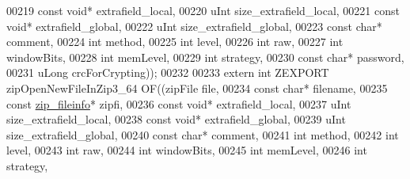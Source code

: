 \begin{DoxyCode}
00219                                             \textcolor{keyword}{const} \textcolor{keywordtype}{void}* extrafield\_local,
00220                                             uInt size\_extrafield\_local,
00221                                             \textcolor{keyword}{const} \textcolor{keywordtype}{void}* extrafield\_global,
00222                                             uInt size\_extrafield\_global,
00223                                             \textcolor{keyword}{const} \textcolor{keywordtype}{char}* comment,
00224                                             \textcolor{keywordtype}{int} method,
00225                                             \textcolor{keywordtype}{int} level,
00226                                             \textcolor{keywordtype}{int} raw,
00227                                             \textcolor{keywordtype}{int} windowBits,
00228                                             \textcolor{keywordtype}{int} memLevel,
00229                                             \textcolor{keywordtype}{int} strategy,
00230                                             \textcolor{keyword}{const} \textcolor{keywordtype}{char}* password,
00231                                             uLong crcForCrypting));
00232 
00233 \textcolor{keyword}{extern} \textcolor{keywordtype}{int} ZEXPORT zipOpenNewFileInZip3\_64 OF((zipFile file,
00234                                             \textcolor{keyword}{const} \textcolor{keywordtype}{char}* filename,
00235                                             \textcolor{keyword}{const} \hyperlink{structzip__fileinfo}{zip\_fileinfo}* zipfi,
00236                                             \textcolor{keyword}{const} \textcolor{keywordtype}{void}* extrafield\_local,
00237                                             uInt size\_extrafield\_local,
00238                                             \textcolor{keyword}{const} \textcolor{keywordtype}{void}* extrafield\_global,
00239                                             uInt size\_extrafield\_global,
00240                                             \textcolor{keyword}{const} \textcolor{keywordtype}{char}* comment,
00241                                             \textcolor{keywordtype}{int} method,
00242                                             \textcolor{keywordtype}{int} level,
00243                                             \textcolor{keywordtype}{int} raw,
00244                                             \textcolor{keywordtype}{int} windowBits,
00245                                             \textcolor{keywordtype}{int} memLevel,
00246                                             \textcolor{keywordtype}{int} strategy,

\end{DoxyCode}
